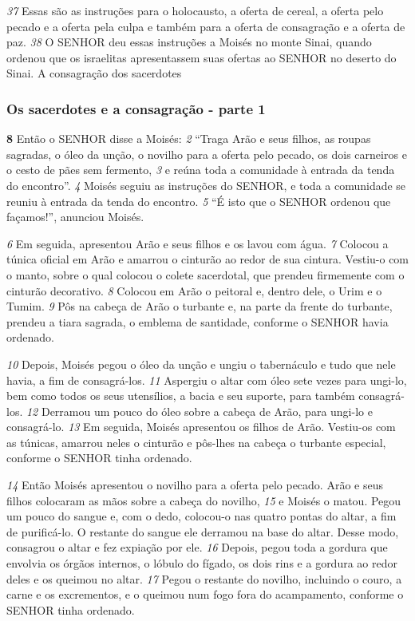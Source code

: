 \bigskip
\textit{\tiny 37}
Essas são as instruções para o holocausto, a oferta de cereal, a oferta pelo
pecado e a oferta pela culpa e também para a oferta de consagração e a oferta de
paz. 
\textit{\tiny 38}
O SENHOR deu essas instruções a Moisés no monte Sinai, quando ordenou
que os israelitas apresentassem suas ofertas ao SENHOR no deserto do Sinai.
A consagração dos sacerdotes
   
\bigskip
\subsubsection*{Os sacerdotes e a consagração - parte 1}  
\textbf{\large 8} Então o SENHOR disse a Moisés: 
\textit{\tiny 2} 
“Traga Arão e seus filhos, as roupas sagradas,
o óleo da unção, o novilho para a oferta pelo pecado, os dois carneiros e o cesto de
pães sem fermento, 
\textit{\tiny 3} 
e reúna toda a comunidade à entrada da tenda do encontro”. 
\textit{\tiny 4} 
Moisés   seguiu as instruções do SENHOR, e toda a comunidade se reuniu à
entrada da tenda do encontro. 
\textit{\tiny 5} 
“É isto que o SENHOR ordenou que façamos!”,
anunciou Moisés. 

\smallskip
\textit{\tiny 6} 
Em seguida, apresentou Arão e seus filhos e os lavou com água. 
\textit{\tiny 7} 
Colocou a túnica oficial em Arão e amarrou o cinturão ao redor de sua cintura.
Vestiu-o com o manto, sobre o qual colocou o colete sacerdotal, que prendeu
firmemente com o cinturão decorativo. 
\textit{\tiny 8} 
Colocou em Arão o peitoral e, dentro
dele, o Urim e o Tumim. 
\textit{\tiny 9} 
Pôs na cabeça de Arão o turbante e, na parte da frente
do turbante, prendeu a tiara sagrada, o emblema de santidade, conforme o
SENHOR havia ordenado.   

\smallskip
\textit{\tiny 10}
Depois, Moisés pegou o óleo da unção e ungiu o tabernáculo e tudo que nele
havia, a fim de consagrá-los. 
\textit{\tiny 11}
Aspergiu o altar com óleo sete vezes para ungi-lo,
bem como todos os seus utensílios, a bacia e seu suporte, para também consagrá-
los. 
\textit{\tiny 12}
Derramou um pouco do óleo sobre a cabeça de Arão, para ungi-lo e
consagrá-lo. 
\textit{\tiny 13}
Em seguida, Moisés apresentou os filhos de Arão. Vestiu-os com as
túnicas, amarrou neles o cinturão e pôs-lhes na cabeça o turbante especial,
conforme o SENHOR tinha ordenado.
   
\smallskip
\textit{\tiny 14}
Então Moisés apresentou o novilho para a oferta pelo pecado. Arão e seus
filhos colocaram as mãos sobre a cabeça do novilho, 
\textit{\tiny 15}
e Moisés o matou. Pegou
um pouco do sangue e, com o dedo, colocou-o nas quatro pontas do altar, a fim de
purificá-lo. O restante do sangue ele derramou na base do altar. Desse modo,
consagrou o altar e fez expiação por ele.
\textit{\tiny 16}
Depois, pegou toda a gordura que
envolvia os órgãos internos, o lóbulo do fígado, os dois rins e a gordura ao redor
deles e os queimou no altar. 
\textit{\tiny 17}
Pegou o restante do novilho, incluindo o couro, a
carne e os excrementos, e o queimou num fogo fora do acampamento, conforme
o SENHOR tinha ordenado.
   
